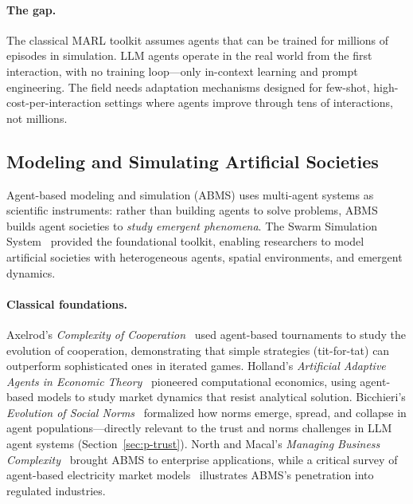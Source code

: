 \documentclass{article}
\begin{document}
\paragraph{The gap.}
The classical MARL toolkit assumes agents that can be trained for millions of episodes
in simulation. LLM agents operate in the real world from the first interaction, with
no training loop---only in-context learning and prompt engineering. The field needs
adaptation mechanisms designed for few-shot, high-cost-per-interaction settings where
agents improve through tens of interactions, not millions.

\subsection{Modeling and Simulating Artificial Societies}
\label{sec:p-mabs}

%
%
%

Agent-based modeling and simulation (ABMS) uses multi-agent systems as scientific
instruments: rather than building agents to solve problems, ABMS builds agent societies
to \emph{study emergent phenomena}. The Swarm Simulation System~\citep{sutra15089_swarm1996}
provided the foundational toolkit, enabling researchers to model artificial
societies with heterogeneous agents, spatial environments, and emergent dynamics.

\paragraph{Classical foundations.}
Axelrod's \emph{Complexity of Cooperation}~\citep{sutra14993_complexity1998} used
agent-based tournaments to study the evolution of cooperation, demonstrating that
simple strategies (tit-for-tat) can outperform sophisticated ones in iterated games.
Holland's \emph{Artificial Adaptive Agents in Economic Theory}~\citep{sutra15045_artificial1991}
pioneered computational economics, using agent-based models to study market dynamics
that resist analytical solution. Bicchieri's \emph{Evolution of Social
Norms}~\citep{sutra18332_evolution2015} formalized how norms emerge, spread, and
collapse in agent populations---directly relevant to the trust and norms challenges
in LLM agent systems (Section~\ref{sec:p-trust}).
North and Macal's \emph{Managing Business
Complexity}~\citep{sutra15786_managing2007} brought ABMS to enterprise applications,
while a critical survey of agent-based electricity market
models~\citep{sutra17432_critical2008} illustrates ABMS's penetration into regulated
industries.
\end{document}
